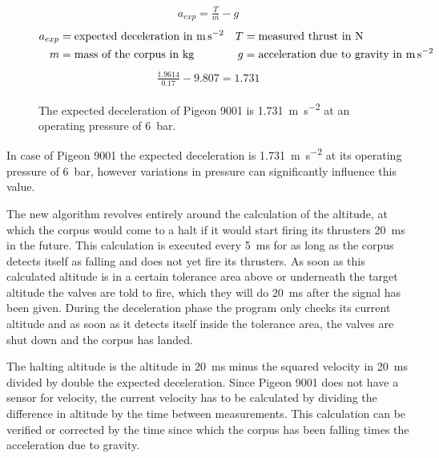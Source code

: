 \begin{figure}[H]
\begin{align*}
a_{exp}={\frac {T}{m}}-g
\end{align*}
\begin{align*}
a_{exp} &= \text{expected deceleration in \si{\meter\per\second\squared}} & T &= \text{measured thrust in \si{\newton}} \\
m &= \text{mass of the corpus in \si{\kilo\gram}} & g &= \text{acceleration due to gravity in \si{\meter\per\second\squared}}
\end{align*}
\begin{align*}
{\frac {1.9614}{0.17}}-9.807=1.731
\end{align*}
\caption{The expected deceleration of Pigeon 9001 is \SI{1.731}{\meter\per\second\squared} at an operating pressure of \SI{6}{\bar}.}
\end{figure}

In case of Pigeon 9001 the expected deceleration is \SI{1.731}{\meter\per\second\squared} at its operating pressure of \SI{6}{\bar}, however variations in pressure can significantly influence this value.

The new algorithm revolves entirely around the calculation of the altitude, at which the corpus would come to a halt if it would start firing its thrusters \SI{20}{\milli\second} in the future. This calculation is executed every \SI{5}{\milli\second} for as long as the corpus detects itself as falling and does not yet fire its thrusters. As soon as this calculated altitude is in a certain tolerance area above or underneath the target altitude the valves are told to fire, which they will do \SI{20}{\milli\second} after the signal has been given. During the deceleration phase the program only checks its current altitude and as soon as it detects itself inside the tolerance area, the valves are shut down and the corpus has landed.

The halting altitude is the altitude in \SI{20}{\milli\second} minus the squared velocity in \SI{20}{\milli\second} divided by double the expected deceleration. Since Pigeon 9001 does not have a sensor for velocity, the current velocity has to be calculated by dividing the difference in altitude by the time between measurements. This calculation can be verified or corrected by the time since which the corpus has been falling times the acceleration due to gravity.

